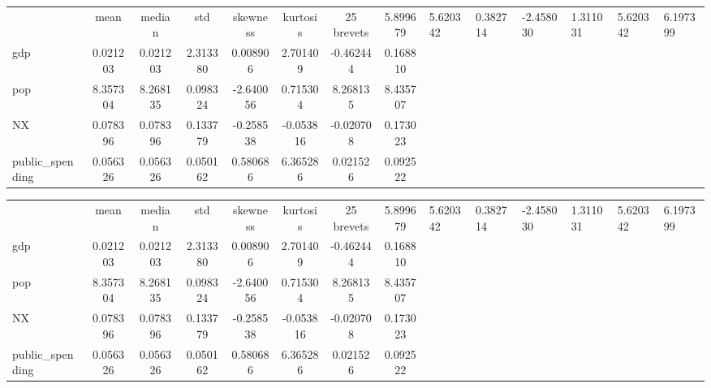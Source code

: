 \begin{tabular}{lccccccc}
\toprule
 & mean & median & std & skewness & kurtosis & 25%
\midrule
brevets & 5.899679 & 5.620342 & 0.382714 & -2.458030 & 1.311031 & 5.620342 & 6.197399 \\
gdp & 0.021203 & 0.021203 & 2.313380 & 0.008906 & 2.701409 & -0.462444 & 0.168810 \\
pop & 8.357304 & 8.268135 & 0.098324 & -2.640056 & 0.715304 & 8.268135 & 8.435707 \\
NX & 0.078396 & 0.078396 & 0.133779 & -0.258538 & -0.053816 & -0.020708 & 0.173023 \\
public_spending & 0.056326 & 0.056326 & 0.050162 & 0.580686 & 6.365286 & 0.021526 & 0.092522 \\
\bottomrule
\end{tabular}


\begin{tabular}{|l|ccccccc|}
    \hline
     & mean & median & std & skewness & kurtosis & 25%
    \hline
    brevets & 5.899679 & 5.620342 & 0.382714 & -2.458030 & 1.311031 & 5.620342 & 6.197399 \\
    gdp & 0.021203 & 0.021203 & 2.313380 & 0.008906 & 2.701409 & -0.462444 & 0.168810 \\
    pop & 8.357304 & 8.268135 & 0.098324 & -2.640056 & 0.715304 & 8.268135 & 8.435707 \\
    NX & 0.078396 & 0.078396 & 0.133779 & -0.258538 & -0.053816 & -0.020708 & 0.173023 \\
    public_spending & 0.056326 & 0.056326 & 0.050162 & 0.580686 & 6.365286 & 0.021526 & 0.092522 \\
    \hline
\end{tabular}